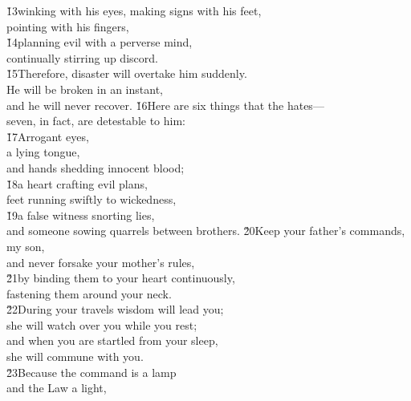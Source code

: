 \begin{poetry}
\poeml \v{13}winking with his eyes, making signs with his feet, \\
\poemll    pointing with his fingers, \\
\poeml \v{14}planning evil with a perverse mind, \\
\poemll    continually stirring up discord. \\
\poeml \v{15}Therefore, disaster will overtake him suddenly. \\
\poemll    He will be broken in an instant, \\
\poemlll       and he will never recover.
\poeml \v{16}Here are six things that the  hates--- \\
\poemll    seven, in fact, are detestable to him: \\
\poeml \v{17}Arrogant eyes, \\
\poemll    a lying tongue, \\
\poemlll       and hands shedding innocent blood; \\
\poeml \v{18}a heart crafting evil plans, \\
\poemll    feet running swiftly to wickedness, \\
\poeml \v{19}a false witness snorting lies, \\
\poemll    and someone sowing quarrels between brothers.
\poeml \v{20}Keep your father's commands, my son, \\
\poemll    and never forsake your mother's rules, \\
\poeml \v{21}by binding them to your heart continuously, \\
\poemll    fastening them around your neck. \\
\poeml \v{22}During your travels wisdom will lead you; \\
\poemll    she will watch over you while you rest; \\
\poeml and when you are startled from your sleep, \\
\poemll    she will commune with you. \\
\poeml \v{23}Because the command is a lamp \\
\poemll    and the Law a light, \\

\end{poetry}
